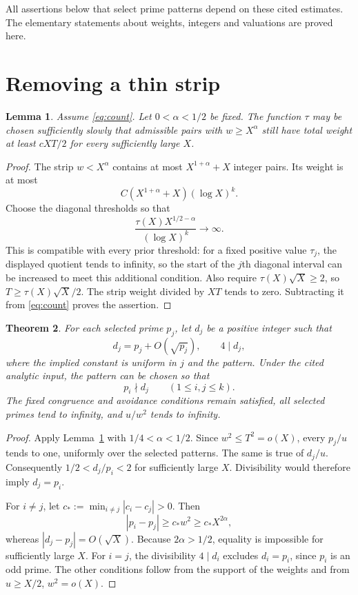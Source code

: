 \documentclass[11pt,a4paper]{article}
\newtheorem{theorem}{Theorem}[section]
\newtheorem{lemma}[theorem]{Lemma}
\theoremstyle{remark}\newtheorem{remark}[theorem]{Remark}
\begin{document}
All assertions below that select prime patterns depend on these cited
estimates. The elementary statements about weights, integers and
valuations are proved here.

\section{Removing a thin strip}
\begin{lemma}\label{lem:strip}
Assume \eqref{eq:count}. Let $0<\alpha<1/2$ be fixed.
The function $\tau$ may be chosen sufficiently slowly that admissible
pairs with $w\ge X^\alpha$ still have total weight at least $cXT/2$
for every sufficiently large $X$.
\end{lemma}
\begin{proof}
The strip $w<X^\alpha$ contains at most $X^{1+\alpha}+X$
integer pairs. Its weight is at most
\[
 C(X^{1+\alpha}+X)(\log X)^k.
\]
Choose the diagonal thresholds so that
\[
 \frac{\tau(X)X^{1/2-\alpha}}{(\log X)^k}\longrightarrow\infty.
\]
This is compatible with every prior threshold: for a fixed positive
value $\tau_j$, the displayed quotient tends to infinity, so the start
of the $j$th diagonal interval can be increased to meet this additional
condition. Also require $\tau(X)\sqrt X\ge2$, so
$T\ge\tau(X)\sqrt X/2$. The strip weight divided by $XT$ tends
to zero. Subtracting it from \eqref{eq:count} proves the assertion.
\end{proof}

\begin{theorem}\label{thm:separation}
For each selected prime $p_j$, let $d_j$ be a positive integer such that
\[
 d_j=p_j+O(\sqrt{p_j}),\qquad 4\mid d_j,
\]
where the implied constant is uniform in $j$ and the pattern.
Under the cited analytic input, the pattern can be chosen so that
\[
                       p_i\nmid d_j\qquad(1\le i,j\le k).
\]
The fixed congruence and avoidance conditions remain satisfied, all
selected primes tend to infinity, and $u/w^2$ tends to infinity.
\end{theorem}
\begin{proof}
Apply Lemma~\ref{lem:strip} with $1/4<\alpha<1/2$.
Since $w^2\le T^2=o(X)$, every $p_j/u$ tends to one, uniformly
over the selected patterns. The same is true of $d_j/u$.
Consequently $1/2<d_j/p_i<2$ for sufficiently large $X$.
Divisibility would therefore imply $d_j=p_i$.

For $i\ne j$, let $c_*:=\min_{i\ne j}|c_i-c_j|>0$. Then
\[
 |p_i-p_j|\ge c_*w^2\ge c_*X^{2\alpha},
\]
whereas $|d_j-p_j|=O(\sqrt X)$. Because $2\alpha>1/2$,
equality is impossible for sufficiently large $X$.
For $i=j$, the divisibility $4\mid d_i$ excludes $d_i=p_i$,
since $p_i$ is an odd prime. The other conditions follow from the
support of the weights and from $u\ge X/2$, $w^2=o(X)$.
\end{proof}
\end{document}
